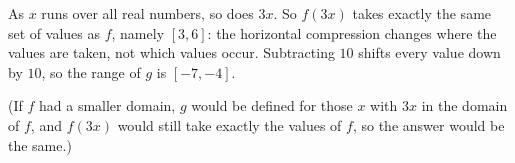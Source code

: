 As $x$ runs over all real numbers, so does $3x$. So $f(3x)$ takes exactly the same set of values as $f$, namely $[3,6]$: the horizontal compression changes where the values are taken, not which values occur. Subtracting $10$ shifts every value down by $10$, so the range of $g$ is $\boxed{[-7,-4]}$.

(If $f$ had a smaller domain, $g$ would be defined for those $x$ with $3x$ in the domain of $f$, and $f(3x)$ would still take exactly the values of $f$, so the answer would be the same.)
